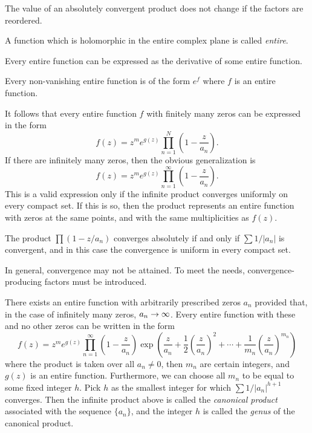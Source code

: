 \begin{proposition}
  The value of an absolutely convergent product does not change if the factors are reordered.
\end{proposition}

\begin{definition}
  A function which is holomorphic in the entire complex plane is called \emph{entire}.
\end{definition}

\begin{proposition}
  Every entire function can be expressed as the derivative of some entire function.
\end{proposition}

\begin{proposition}
  Every non-vanishing entire function is of the form $e^f$ where $f$ is an entire function.
\end{proposition}

It follows that every entire function $f$ with finitely many zeros can be expressed in the form
\[
f(z) = z^m e^{g(z)} \prod_{n=1}^N \left( 1 - \frac{z}{a_n} \right).
\]
If there are infinitely many zeros, then the obvious generalization is
\[
f(z) = z^m e^{g(z)} \prod_{n=1}^\infty \left( 1 - \frac{z}{a_n} \right).
\]
This is a valid expression only if the infinite product converges uniformly on every compact set. If this is so, then the product represents an entire function with zeros at the same points, and with the same multiplicities as $f(z)$.

\begin{proposition}
  The product $\prod (1 - z/a_n)$ converges absolutely if and only if $\sum 1/|a_n|$ is convergent, and in this case the convergence is uniform in every compact set.
\end{proposition}

In general, convergence may not be attained. To meet the needs, convergence-producing factors must be introduced.

\begin{theorem}
  There exists an entire function with arbitrarily prescribed zeros $a_n$ provided that, in the case of infinitely many zeros, $a_n \rightarrow \infty$. Every entire function with these and no other zeros can be written in the form
  \[
  f(z) = z^m e^{g(z)} \prod_{n=1}^\infty \left( 1 - \frac{z}{a_n} \right) \exp\left( \frac{z}{a_n} + \frac{1}{2}\left(\frac{z}{a_n}\right)^2 + \cdots + \frac{1}{m_n}\left(\frac{z}{a_n}\right)^{m_n} \right)
  \]
  where the product is taken over all $a_n \neq 0$, then $m_n$ are certain integers, and $g(z)$ is an entire function. Furthermore, we can choose all $m_n$ to be equal to some fixed integer $h$. Pick $h$ as the smallest integer for which $\sum 1/|a_n|^{h+1}$ converges. Then the infinite product above is called the \emph{canonical product} associated with the sequence $\{a_n\}$, and the integer $h$ is called the \emph{genus} of the canonical product.
\end{theorem}

